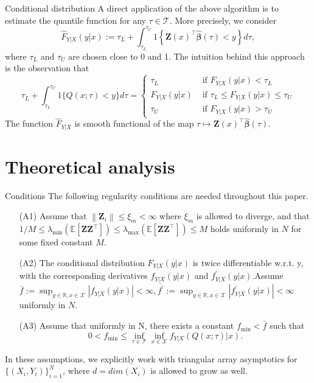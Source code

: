 \documentclass[11pt]{beamer}
\begin{document}
\begin{frame}{Conditional distribution}
A direct application of the above algorithm is to estimate the quantile function for any $\tau \in \mathcal{T}$.
More precisely, we consider
$$
\widehat{F}_{Y | X}(y | x):=\tau_{L}+\int_{\tau_{L}}^{\tau_{U}} 1\left\{\mathbf{Z}(x)^{\top} \widehat{\boldsymbol{\beta}}(\tau)<y\right\} d \tau,
$$
where $\tau_L$ and $\tau_U$ are chosen close to 0 and  1.
The intuition behind this
approach is the observation that
$$
\tau_{L}+\int_{\tau_{L}}^{\tau_{U}} 1\{Q(x ; \tau)<y\} d \tau=\left\{\begin{array}{ll}
\tau_{L} & \text { if } F_{Y | X}(y | x)<\tau_{L} \\
F_{Y | X}(y | x) & \text { if } \tau_{L} \leq F_{Y | X}(y | x) \leq \tau_{U} \\
\tau_{U} & \text { if } F_{Y | X}(y | x)>\tau_{U}
\end{array}\right.
$$
The function $\hat{F}_{Y|X}$ is smooth functional of the map $\tau \mapsto \mathbf{Z}(x)^{\top} \widehat{\boldsymbol{\beta}}(\tau)$.
\end{frame}

\section{Theoretical analysis}
\begin{frame}{Conditions}
The following regularity conditions are needed
throughout this paper.
\begin{itemize}
\item[(A1)] {\color{blue} Assume that $\left\|\mathbf{Z}_{i}\right\| \leq \xi_{m}<\infty$ where $\xi_m$ is allowed to diverge}, and that
$1 / M \leq \lambda_{\min }\left(\mathbb{E}\left[\mathbf{Z Z}^{\top}\right]\right) \leq \lambda_{\max }\left(\mathbb{E}\left[\mathbf{Z Z}^{\top}\right]\right) \leq M$ holds uniformly in $N$ for some fixed constant $M$.
\item[(A2)]  The conditional distribution $F_{Y|X}(y|x)$  is twice differentiable w.r.t. y, with the corresponding derivatives $f_{Y | X}(y | x)$ and $f^{'}_{Y | X}(y | x)$.Assume
$\bar{f}:=\sup _{y \in \mathbb{R}, x \in \mathcal{X}}\left|f_{Y | X}(y | x)\right|<\infty, \overline{f^{\prime}}:=\sup _{y \in \mathbb{R}, x \in \mathcal{X}}\left|f_{Y | X}^{\prime}(y | x)\right|<\infty$ uniformly in $N$.
\item[(A3)] Assume that uniformly in N, there exists a constant $f_{\min}<\bar{f}$ such that
$$
0<f_{\min } \leq \inf _{\tau \in \mathcal{T}} \inf _{x \in \mathcal{X}} f_{Y | X}(Q(x ; \tau) | x).
$$
\end{itemize}
In these assumptions, we explicitly work with triangular array asymptotics for  $\{(X_i,Y_i)\}_{i=1}^N$, where $d=dim(X_i)$ is allowed to grow as well.
\end{frame}
\end{document}
